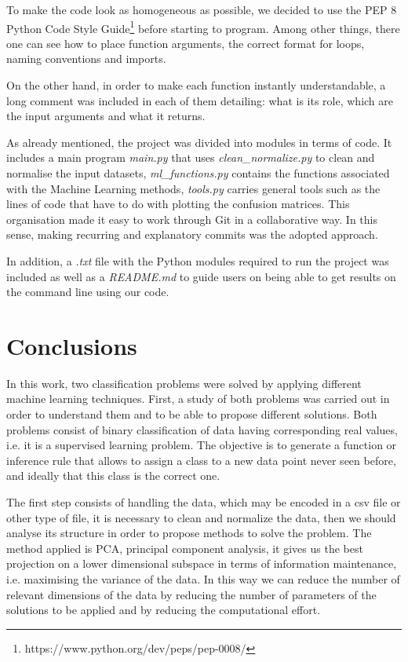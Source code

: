 \documentclass[11pt,a4paper]{article}
\begin{document}
To make the code look as homogeneous as possible, we decided to use the PEP 8 Python Code Style Guide\footnote{https://www.python.org/dev/peps/pep-0008/} before starting to program. Among other things, there one can see how to place function arguments, the correct format for loops, naming conventions and imports.

On the other hand, in order to make each function instantly understandable, a long comment was included in each of them detailing: what is its role, which are the input arguments and what it returns.

As already mentioned, the project was divided into modules in terms of code. It includes a main program \textit{main.py} that uses \textit{clean\_normalize.py} to clean and normalise the input datasets, \textit{ml\_functions.py} contains the functions associated with the Machine Learning methods, \textit{tools.py} carries general tools such as the lines of code that have to do with plotting the confusion matrices. This organisation made it easy to work through Git in a collaborative way. In this sense, making recurring and explanatory commits was the adopted approach.

In addition, a \textit{.txt} file with the Python modules required to run the project was included as well as a \textit{README.md} to guide users on being able to get results on the command line using our code.


\section{Conclusions}

In this work, two classification problems were solved by applying different machine learning techniques. First, a study of both problems was carried out in order to understand them and to be able to propose different solutions. Both problems consist of binary classification of data having corresponding real values, i.e. it is a supervised learning problem. The objective is to generate a function or inference rule that allows to assign a class to a new data point never seen before, and ideally that this class is the correct one.

The first step consists of handling the data, which may be encoded in a csv file or other type of file, it is necessary to clean and normalize the data, then we should analyse its structure in order to propose methods to solve the problem. The method applied is PCA, principal component analysis, it gives us the best projection on a lower dimensional subspace in terms of information maintenance, i.e. maximising the variance of the data. In this way we can reduce the number of relevant dimensions of the data by reducing the number of parameters of the solutions to be applied and by reducing the computational effort. 
\end{document}

